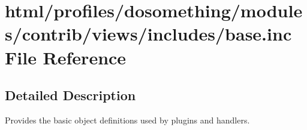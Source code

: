 \hypertarget{base_8inc}{
\section{html/profiles/dosomething/modules/contrib/views/includes/base.inc File Reference}
\label{base_8inc}
}


\subsection{Detailed Description}
Provides the basic object definitions used by plugins and handlers. 